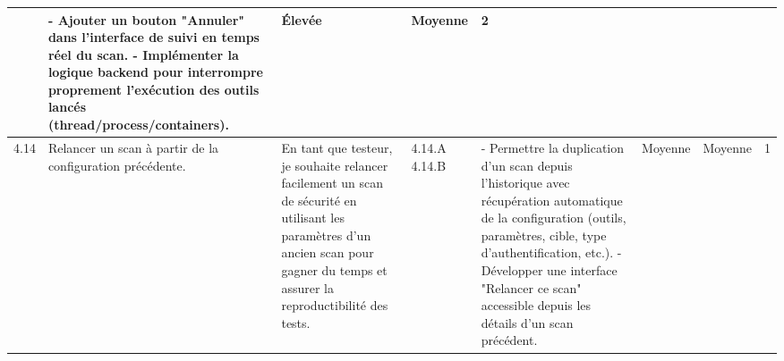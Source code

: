 \begin{landscape}
\begin{spacing}{0.94}
\begin{longtable}{|p{0.6cm}|p{2.6cm}|p{4.9cm}|p{0.97cm}|p{8.6cm}|p{0.35cm}|p{0.35cm}|p{1.6cm}|}
                    & 
                    - Ajouter un bouton "Annuler" dans l'interface de suivi en temps réel du scan.\newline
                    - Implémenter la logique backend pour interrompre proprement l'exécution des outils lancés (thread/process/containers).
                    & Élevée & Moyenne & 2 \\
                \hline
                4.14 & Relancer un scan à partir de la configuration précédente.
                & En tant que testeur, je souhaite relancer facilement un scan de sécurité en utilisant les paramètres d’un ancien scan pour gagner du temps et assurer la reproductibilité des tests.
                & 4.14.A \newline\vspace{0.5cm} 4.14.B 
                &
                - Permettre la duplication d’un scan depuis l’historique avec récupération automatique de la configuration (outils, paramètres, cible, type d’authentification, etc.). \newline
                - Développer une interface "Relancer ce scan" accessible depuis les détails d’un scan précédent. \newline
                & Moyenne & Moyenne & 1 \\
            \hline


\end{longtable}
\end{spacing}
\end{landscape}
